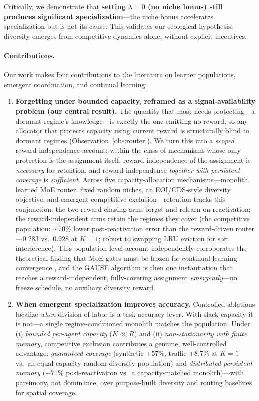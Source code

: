 \documentclass{article}
\begin{document}
Critically, we demonstrate that \textbf{setting $\lambda = 0$ (no niche bonus) still produces significant specialization}---the niche bonus accelerates specialization but is not its cause. This validates our ecological hypothesis: diversity emerges from competitive dynamics alone, without explicit incentives.

\paragraph{Contributions.} Our work makes four contributions to the literature on
learner populations, emergent coordination, and continual learning:

\begin{enumerate}
    \item \textbf{Forgetting under bounded capacity, reframed as a
    signal-availability problem (our central result).} The quantity that most
    needs protecting---a dormant regime's knowledge---is exactly the one emitting
    no reward, so any allocator that protects capacity using current reward is
    structurally blind to dormant regimes (Observation~\ref{obs:router}). We turn
    this into a \emph{scoped} reward-independence account: within the class of
    mechanisms whose only protection is the assignment itself, reward-independence
    of the assignment is \emph{necessary} for retention, and reward-independence
    \emph{together with persistent coverage} is \emph{sufficient}. Across five
    capacity-allocation mechanisms---monolith, learned MoE router, fixed random
    niches, an EOI/CDS-style diversity objective, and emergent competitive
    exclusion---retention tracks this conjunction: the two reward-chasing arms
    forget and relearn on reactivation; the reward-independent arms retain the
    regimes they cover (the competitive population: $\sim$70\% lower post-reactivation
    error than the reward-driven router---$0.283$ vs.\ $0.928$ at $K{=}1$; robust to
    swapping LRU eviction for soft interference). This population-level account independently corroborates the
    theoretical finding that MoE gates must be frozen for continual-learning
    convergence \cite{li2024moecl}, and the GAUSE algorithm is then one
    instantiation that reaches a reward-independent, fully-covering assignment
    \emph{emergently}---no freeze schedule, no auxiliary diversity reward.

    \item \textbf{When emergent specialization improves accuracy.} Controlled
    ablations localize \emph{when} division of labor is a task-accuracy lever.
    With slack capacity it is not---a single regime-conditioned monolith matches
    the population. Under (i) \emph{bounded per-agent capacity} ($K \ll R$) and
    (ii) \emph{non-stationarity with finite memory}, competitive exclusion
    contributes a genuine, well-controlled advantage: \emph{guaranteed coverage}
    (synthetic $+57\%$, traffic $+8.7\%$ at $K{=}1$ vs.\ an equal-capacity
    random-diversity population) and \emph{distributed persistent memory}
    ($+71\%$ post-reactivation vs.\ a capacity-matched monolith)---with
    parsimony, not dominance, over purpose-built diversity and routing baselines
    for spatial coverage.


\end{enumerate}
\end{document}
